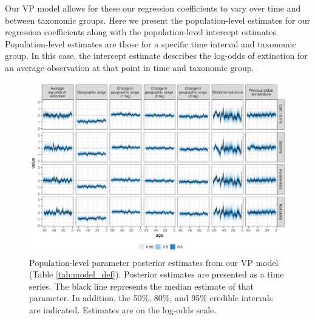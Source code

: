 \documentclass[12pt,letterpaper]{article}
\begin{document}
\begin{refsection}
Our VP model allows for these our regression coefficients to vary over time and between taxonomic groups. Here we present the population-level estimates for our regression coefficients along with the population-level intercept estimates. Population-level estimates are those for a specific time interval and taxonomic group. In this case, the intercept estimate describes the log-odds of extinction for an average observation at that point in time and taxonomic group.

\begin{figure}[<+htpb+>]
  \centering
  \includegraphics{../results/figure/eff_time_group}
  \caption{Population-level parameter posterior estimates from our VP model (Table \ref{tab:model_def}). Posterior estimates are presented as a time series. The black line represents the median estimate of that parameter. In addition, the 50\%, 80\%, and 95\% credible intervals are indicated. Estimates are on the log-odds scale.}
  \label{fig:param_est_time_group}
\end{figure}



\printbibliography[title={Supplementary References}]
\end{refsection}
\end{document}
